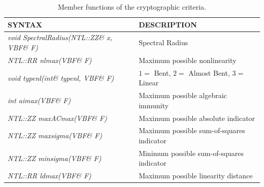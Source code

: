 \begin{table}[htbp]
\caption{Member functions of the cryptographic criteria.}
\centering
\label{tab:Info}
\begin{tabular}{ l l }
\toprule
SYNTAX & DESCRIPTION \\
\midrule
\textit{void SpectralRadius(NTL::ZZ\& x, VBF\& F)} & Spectral Radius \\
\textit{NTL::RR nlmax(VBF\& F)} & Maximum possible nonlinearity \\ 
\textit{void typenl(int\& typenl, VBF\& F)} & $1=$ Bent, $2=$ Almost Bent, $3=$ Linear \\
\textit{int aimax(VBF\& F)} & Maximum possible algebraic immunity \\
\textit{NTL::ZZ maxACmax(VBF\& F)} & Maximum possible absolute indicator \\
\textit{NTL::ZZ maxsigma(VBF\& F)} & Maximum possible sum-of-squares indicator \\
\textit{NTL::ZZ minsigma(VBF\& F)} & Minimum possible sum-of-squares indicator \\
\textit{NTL::RR ldmax(VBF\& F)} & Maximum possible linearity distance \\
\bottomrule
\end{tabular}
\end{table}

